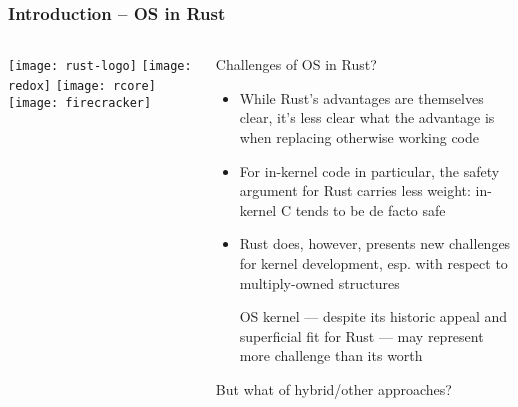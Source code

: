 \begin{frame}[plain]
	\frametitle{Introduction -- OS in Rust}
	
	
	
	\begin{columns}
		
		\begin{column}{.2\textwidth}
			
			\texttt{[image: rust-logo]}
			\texttt{[image: redox]}
			\texttt{[image: rcore]}
			\texttt{[image: firecracker]}
		\end{column}
		
		\begin{column}{.8\textwidth}
			
			Challenges of OS in Rust? 
			
			\begin{itemize}
				
				\item While Rust’s advantages are themselves clear, it’s less clear
				what the advantage is when replacing otherwise working code
				
				\item   For in-kernel code in particular, the safety argument for Rust carries less weight: in-kernel C tends to be de facto safe

				\item Rust does, however, presents new challenges for kernel
				development, esp. with respect to multiply-owned structures

				\itemAn OS kernel — despite its historic appeal and superficial fit for	Rust — may represent more challenge than its worth
				
				
			\end{itemize}
			But what of hybrid/other approaches?
			
		\end{column}
		
		
	\end{columns}
	
	
\end{frame}


